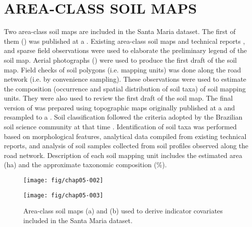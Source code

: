 
\section{AREA-CLASS SOIL MAPS}
\label{sec:covar-data-soil-maps}

Two area-class soil maps are included in the Santa Maria dataset. The first of them (\soilOld{}) was published 
at a  \cite{AzolinEtAl1988}. Existing area-class soil maps and technical reports 
\cite{Brasil1973, Azolin1977, MacielEtAl1987a, MacielEtAl1987, AbraoEtAl1988}, and sparse field observations 
were used to elaborate the preliminary legend of the soil map. Aerial photographs () were used to 
produce the first draft of the soil map. Field checks of soil polygons (i.e. mapping units) was done along the 
road network (i.e. 
by convenience sampling). These observations were used to estimate the composition (occurrence and spatial 
distribution of soil taxa) of soil mapping units. They were also used to review the first draft of the soil 
map. The final version of \soilOld{} was prepared using topographic maps originally published at a 
 and resampled to a . Soil classification followed the criteria adopted by the 
Brazilian soil science community at that time \cite{Brasil1973, CamargoEtAl1982, Carvalho1982, LemosEtAl1982, 
OlmosEtAl1982}. Identification of soil taxa was performed based on morphological features, analytical data 
compiled from existing technical reports, and analysis of soil samples collected from soil profiles observed 
along the road network. Description of each soil mapping unit includes the estimated area (\si{\hectare}) and 
the approximate taxonomic composition (\si{\percent}).

\begin{figure}[!ht]
\centering
\begin{minipage}[b]{63mm}
\subcaption{}
\centering
\texttt{[image: fig/chap05-002]}
\end{minipage}
\begin{minipage}[b]{63mm}
\subcaption{}
\centering
\texttt{[image: fig/chap05-003]}
\end{minipage} 
\caption{Area-class soil maps (a) \soilOld{} and (b) \soilNew{} used to derive indicator covariates included 
in the Santa Maria dataset.}
\label{fig:covar-data-soil-maps}
\end{figure}

